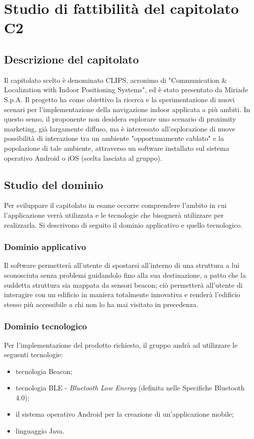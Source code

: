 \documentclass[../StudioDiFattibilita.tex]{subfiles}
\begin{document}
\section{Studio di fattibilità del capitolato C2}
	\subsection{Descrizione del capitolato}
	Il capitolato scelto è denominato CLIPS, acronimo di "Communication \& Localization with Indoor Positioning Systems", ed è stato presentato da Miriade S.p.A.
	Il progetto ha come obiettivo la ricerca e la sperimentazione di nuovi scenari per l'implementazione della navigazione indoor applicata a più ambiti.
	In questo senso, il proponente non desidera esplorare uno scenario di proximity marketing, già largamente diffuso, ma è interessato all'esplorazione di nuove possibilità di interazione tra un ambiente "opportunamente cablato" e la popolazione di tale ambiente, attraverso un software installato sul sistema operativo Android o iOS (scelta lasciata al gruppo).
	\subsection{Studio del dominio}
	Per sviluppare il capitolato in esame occorre comprendere l'ambito in cui l'applicazione verrà utilizzata e le tecnologie che bisognerà utilizzare per realizzarla. Si descrivono di seguito il dominio applicativo e quello tecnologico.
		\subsubsection{Dominio applicativo}
		Il software permetterà all'utente di spostarsi all'interno di una struttura a lui sconosciuta senza problemi guidandolo fino alla sua destinazione, a patto che la suddetta struttura sia mappata da sensori beacon; ciò permetterà all'utente di interagire con un edificio in maniera totalmente innovativa e renderà l'edificio stesso più accessibile a chi non lo ha mai visitato in precedenza.
		\subsubsection{Dominio tecnologico}
		Per l'implementazione del prodotto richiesto, il gruppo andrà ad utilizzare le seguenti tecnologie:
			\begin{itemize}
				\item tecnologia Beacon;
				\item tecnologia BLE - \textit{Bluetooth Low Energy} (definita nelle Specifiche Bluetooth 4.0);
				\item il sistema operativo Android per la creazione di un'applicazione mobile;
				\item linguaggio Java.
			\end{itemize}
\end{document}
